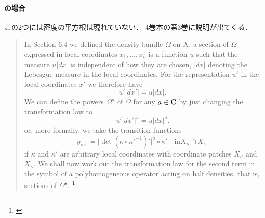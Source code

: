 \paragraph{\cite{Hor85}の場合}
この2つには密度の平方根は現れていない．
4巻本の第3巻\cite[18章]{Hor85}に説明が出てくる．
\begin{quotation}
    In Section 6.4 we defined the density bundle \(\varOmega\) 
    on \(X\): a section of \(\varOmega\) expressed 
    in local coordinates \(x_1,\dots,x_n\) is a function \(u\) 
    such that the measure \(u|dx|\) is independent of 
    how they are chosen, \(|dx|\) denoting the Lebesgue measure 
    in the local coordinates. 
    For the representation \(u'\) in the local coordinates \(x'\) 
    we therefore have
    \[u' |dx'|=u|dx|.\]
    We can define the powers \(\varOmega^a\) 
    of \(\varOmega\) for any \(a\in\mathbf{C}\) by just changing the
    transformation law to
    \[u' |dx'|^a=u|dx|^a.\]
    or, more formally, we take the transition functions
    \[
        g_{\kappa\kappa'}=\lvert
            \det(\kappa\circ\kappa'^{-1})'
        \rvert^a\circ\kappa'
        \quad
        \text{in}
        X_{\kappa}\cap X_{\kappa'}
    \]
    if \(\kappa\) and \(\kappa'\) are 
    arbitrary local coordinates 
    with coordinate patches \(X_{\kappa}\) and \(X_{\kappa}\). 
    We shall now work out the transformation law 
    for the second term in the symbol 
    of a polyhomogeneous operator acting on half densities, 
    that is, sections of \(\varOmega^{\frac{1}{2}}\). \footnote{\cite[p.92]{Hor85}}
\end{quotation}


